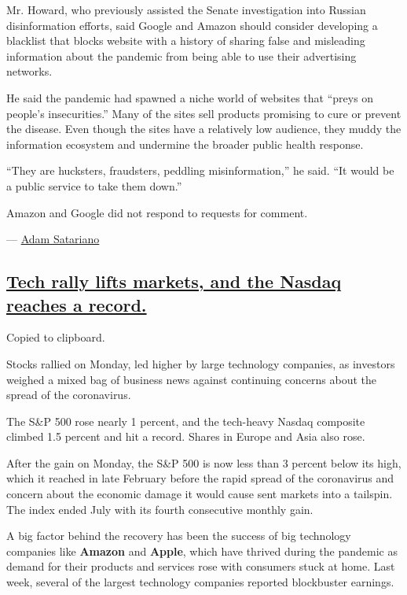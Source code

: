 Mr. Howard, who previously assisted the Senate investigation into
Russian disinformation efforts, said Google and Amazon should consider
developing a blacklist that blocks website with a history of sharing
false and misleading information about the pandemic from being able to
use their advertising networks.

He said the pandemic had spawned a niche world of websites that ``preys
on people's insecurities.'' Many of the sites sell products promising to
cure or prevent the disease. Even though the sites have a relatively low
audience, they muddy the information ecosystem and undermine the broader
public health response.

``They are hucksters, fraudsters, peddling misinformation,'' he said.
``It would be a public service to take them down.''

Amazon and Google did not respond to requests for comment.

--- \href{https://www.nytimes3xbfgragh.onion/by/adam-satariano}{Adam
Satariano}

\hypertarget{tech-rally-lifts-markets-and-the-nasdaq-reaches-a-record}{%
\subsection{\texorpdfstring{\protect\hyperlink{tech-rally-lifts-markets-and-the-nasdaq-reaches-a-record}{Tech
rally lifts markets, and the Nasdaq reaches a
record.}}{Tech rally lifts markets, and the Nasdaq reaches a record.}}\label{tech-rally-lifts-markets-and-the-nasdaq-reaches-a-record}}

Copied to clipboard.

Stocks rallied on Monday, led higher by large technology companies, as
investors weighed a mixed bag of business news against continuing
concerns about the spread of the coronavirus.

The S\&P 500 rose nearly 1 percent, and the tech-heavy Nasdaq composite
climbed 1.5 percent and hit a record. Shares in Europe and Asia also
rose.

After the gain on Monday, the S\&P 500 is now less than 3 percent below
its high, which it reached in late February before the rapid spread of
the coronavirus and concern about the economic damage it would cause
sent markets into a tailspin. The index ended July with its fourth
consecutive monthly gain.

A big factor behind the recovery has been the success of big technology
companies like \textbf{Amazon} and \textbf{Apple}, which have thrived
during the pandemic as demand for their products and services rose with
consumers stuck at home. Last week, several of the largest technology
companies reported blockbuster earnings.

